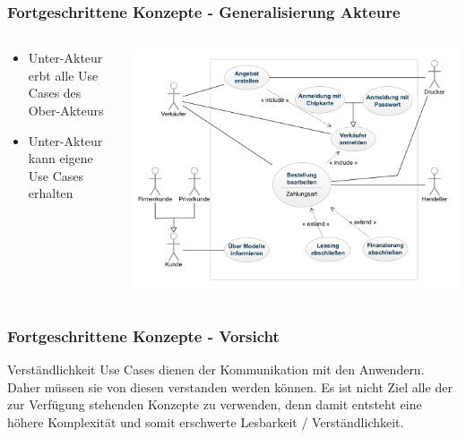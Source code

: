 \begin{frame}
\frametitle{Fortgeschrittene Konzepte - Generalisierung Akteure}
	\begin{columns}
		\begin{column}{.35\textwidth}
			\scriptsize
			\begin{itemize}
				\item Unter-Akteur erbt alle Use Cases des Ober-Akteurs
				\item Unter-Akteur kann eigene Use Cases erhalten
			\end{itemize}
			\normalsize
		\end{column}
		\begin{column}{.65\textwidth}
			\center
			\includegraphics[width=1\textwidth,
			keepaspectratio=true]{bilder/generalisierung_akteur.png}
		\end{column}
	\end{columns}
\end{frame}

\begin{frame}
\frametitle{Fortgeschrittene Konzepte - Vorsicht}
	\begin{alertblock}{Verständlichkeit}
		Use Cases dienen der Kommunikation mit den Anwendern. Daher müssen sie von diesen
		verstanden werden können. Es ist nicht Ziel alle der zur Verfügung stehenden Konzepte
		zu verwenden, denn damit entsteht eine höhere Komplexität und somit erschwerte Lesbarkeit
		/ Verständlichkeit.
	\end{alertblock}
\end{frame}

